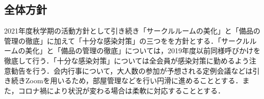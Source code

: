 \subsection*{全体方針}


2021年度秋学期の活動方針として引き続き「サークルルームの美化」と「備品の管理の徹底」に加えて「十分な感染対策」の三つをを方針とする．「サークルルームの美化」と「備品の管理の徹底」については，2019年度以前同様呼びかけを徹底して行う．「十分な感染対策」については全会員が感染対策に勤めるよう注意勧告を行う．会内行事について，大人数の参加が予想される定例会議などは引き続きZoomを用いるため，部屋管理などを行い円滑に進めることとする．また，コロナ禍により状況が変わる場合は柔軟に対応することとする．
